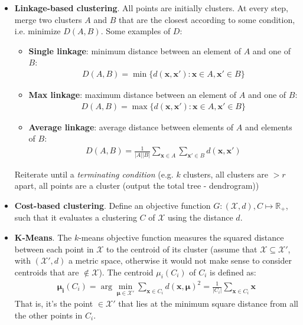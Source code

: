 \documentclass[../template.tex]{subfiles}
\begin{document}
\begin{itemize}
    \item \textbf{Linkage-based clustering}. All points are initially clusters. At every step, merge two clusters $A$ and $B$ that are the closest according to some condition, i.e. minimize $D(A,B)$. Some examples of $D$:
    \begin{itemize}
        \item \textbf{Single linkage}: minimum distance between an element of $A$ and one of $B$:
        \begin{align*}
            D(A,B) = \min \{d(\bm{x}, \bm{x'}) \colon \bm{x} \in A, \bm{x'} \in B \} 
        \end{align*}
        \item \textbf{Max linkage}: maximum distance between an element of $A$ and one of $B$:
        \begin{align*}
            D(A,B) = \max \{d(\bm{x}, \bm{x'}) \colon \bm{x} \in A, \bm{x'} \in B \} 
        \end{align*}
        \item \textbf{Average linkage}: average distance between elements of $A$ and elements of $B$:
        \begin{align*}
            D(A,B) = \frac{1}{|A||B|} \sum_{\bm{x} \in A} \sum_{\bm{x'} \in B} d(\bm{x}, \bm{x'})
        \end{align*} 
    \end{itemize}
    Reiterate until a \textit{terminating condition} (e.g. $k$ clusters, all clusters are $>r$ apart, all points are a cluster (output the total tree - dendrogram)) 

    \item \textbf{Cost-based clustering}. Define an objective function $G \colon (\mathcal{X},d), C \mapsto \mathbb{R}_+$, such that it evaluates a clustering $C$ of $\mathcal{X}$ using the distance $d$. 
    
    \item \textbf{K-Means}. The $k$-means objective function measures the squared distance between each point in $\mathcal{X}$ to the centroid of its cluster (assume that $\mathcal{X}\subseteq \mathcal{X}'$, with $(\mathcal{X}',d)$ a metric space, otherwise it would not make sense to consider centroids that are $\not\in \mathcal{X}$). The centroid $\mu_i(C_i)$ of $C_i$ is defined as:
    \begin{align*}
        \bm{\mu_i}(C_i) = \arg\min_{\bm{\mu}\in \mathcal{X}'} \sum_{\bm{x} \in C_i} d(\bm{x},\bm{\mu})^2 = \frac{1}{|C_i|} \sum_{\bm{x} \in C_i} \bm{x} 
    \end{align*}
    That is, it's the point $\in \mathcal{X}'$ that lies at the minimum square distance from all the other points in $C_i$.
    

\end{itemize}
\end{document}
